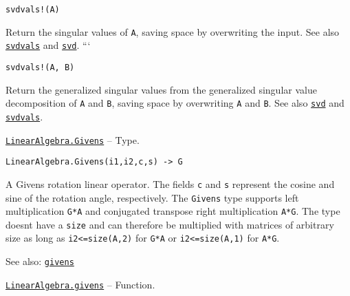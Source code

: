 \begin{adjustwidth}{2em}{0pt}


\begin{verbatim}
svdvals!(A)
\end{verbatim}

Return the singular values of \texttt{A}, saving space by overwriting the input. See also \hyperlink{12905968661134086149}{\texttt{svdvals}} and \hyperlink{6661056220970412040}{\texttt{svd}}. ```




\begin{lstlisting}
svdvals!(A, B)
\end{lstlisting}

Return the generalized singular values from the generalized singular value decomposition of \texttt{A} and \texttt{B}, saving space by overwriting \texttt{A} and \texttt{B}. See also \hyperlink{6661056220970412040}{\texttt{svd}} and \hyperlink{12905968661134086149}{\texttt{svdvals}}.



\end{adjustwidth}
\hypertarget{7608839947605749416}{}
\hyperlink{7608839947605749416}{\texttt{LinearAlgebra.Givens}}  -- {Type.}

\begin{adjustwidth}{2em}{0pt}


\begin{verbatim}
LinearAlgebra.Givens(i1,i2,c,s) -> G
\end{verbatim}

A Givens rotation linear operator. The fields \texttt{c} and \texttt{s} represent the cosine and sine of the rotation angle, respectively. The \texttt{Givens} type supports left multiplication \texttt{G*A} and conjugated transpose right multiplication \texttt{A*G{\textquotesingle}}. The type doesn{\textquotesingle}t have a \texttt{size} and can therefore be multiplied with matrices of arbitrary size as long as \texttt{i2<=size(A,2)} for \texttt{G*A} or \texttt{i2<=size(A,1)} for \texttt{A*G{\textquotesingle}}.

See also: \hyperlink{16453376059429157444}{\texttt{givens}}



\end{adjustwidth}
\hypertarget{16453376059429157444}{}
\hyperlink{16453376059429157444}{\texttt{LinearAlgebra.givens}}  -- {Function.}


